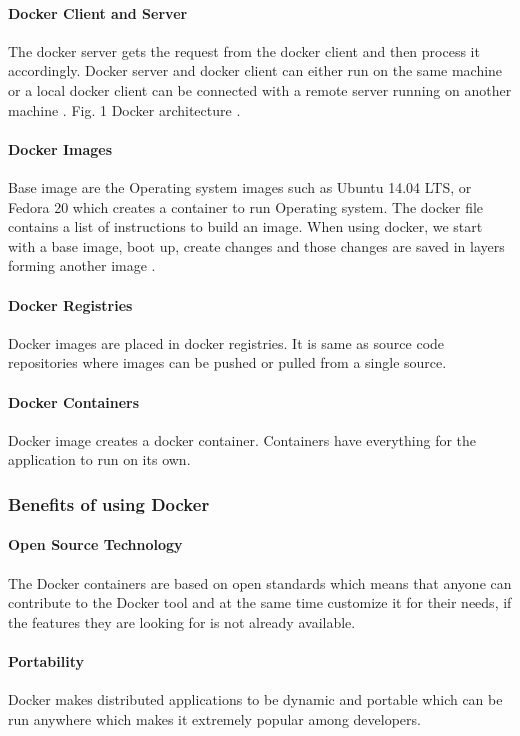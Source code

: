 \documentclass[sigconf]{acmart}
\begin{document}
	\paragraph{Docker Client and Server}
	The docker server gets the request from the docker client and then process it accordingly. Docker server and docker client can either run on the same machine or a local docker client can be connected with a remote server running on another machine \cite{turnbull2014docker}.
	Fig. 1 Docker architecture \cite{turnbull2014docker}.
	\paragraph{Docker Images}
	Base image are the Operating system images such as Ubuntu 14.04 LTS, or Fedora 20 which creates a container to run Operating system. The docker file contains a list of instructions to build an image. When using docker, we start with a base image, boot up, create changes and those changes are saved in layers forming another image \cite{rad2017introduction}.
	\paragraph{Docker Registries}
	Docker images are placed in docker registries. It is same as source code repositories where images can be pushed or pulled from a single source.
	\paragraph{Docker Containers}
	Docker image creates a docker container. Containers have everything for the application to run on its own.
	
	\subsubsection{Benefits of using Docker}
	\paragraph{Open Source Technology}
	The Docker containers are based on open standards which means that anyone can contribute to the Docker tool and at the same time customize it for their needs, if the features they are looking for is not already available.
	\paragraph{Portability}
	Docker makes distributed applications to be dynamic and portable which can be run anywhere which makes it extremely popular among developers.
\end{document}
